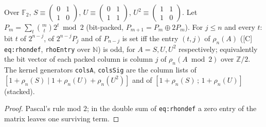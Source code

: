 \begin{theorem}\label{thm:lv-f1}
  \leanok
  Over $\mathbb F_2$, $S\equiv\left(\begin{smallmatrix}0&1\\1&0\end{smallmatrix}\right)$, $U\equiv\left(\begin{smallmatrix}0&1\\1&1\end{smallmatrix}\right)$,
  $U^2\equiv\left(\begin{smallmatrix}1&1\\1&0\end{smallmatrix}\right)$.  Let $P_m=\sum_t\binom mt 2^t\bmod 2$ (bit-packed, $P_{m+1}=P_m\oplus 2P_m$).  For $j\le n$
  and every $t$: bit $t$ of $2^{n-j}$, of $2^{n-j}P_j$ and of $P_{n-j}$ is set iff the entry $(t,j)$ of $\rho_n(A)$
  ([C] \texttt{eq:rhondef}, \texttt{rhoEntry} over $\mathbb N$) is odd, for $A=S,U,U^2$ respectively; equivalently the bit vector of
  each packed column is column $j$ of $\rho_n(A\bmod 2)$ over $\mathbb Z/2$.  The kernel generators \texttt{colsA},
  \texttt{colsSig} are the column lists of $[1+\rho_n(S)\mid 1+\rho_n(U)+\rho_n(U^2)]$ and of $[1+\rho_n(S)\,;\,1+\rho_n(U)]$ (stacked).
\end{theorem}
\begin{proof}
  \leanok
  Pascal's rule mod $2$; in the double sum of \texttt{eq:rhondef} a zero entry of the matrix leaves one surviving term.
\end{proof}

